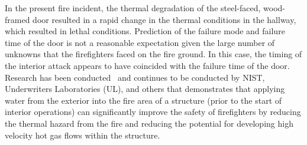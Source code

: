 \documentclass[12pt,oneside]{book}
\begin{document}
In the present fire incident, the thermal degradation of the steel-faced, wood-framed door resulted in a rapid change in the thermal conditions in the hallway, which resulted in lethal conditions.  Prediction of the failure mode and failure time of the door is not a reasonable expectation given the large number of unknowns that the firefighters faced on the fire ground.  In this case, the timing of the interior attack appears to have coincided with the failure time of the door. Research has been conducted~\cite{madrzykowski2009fire, kerber2009fire} and continues to be conducted by NIST, Underwriters Laboratories (UL), and others that demonstrates that applying water from the exterior into the fire area of a structure (prior to the start of interior operations) can significantly improve the safety of firefighters by reducing the thermal hazard from the fire and reducing the potential for developing high velocity hot gas flows within the structure.
\end{document}
